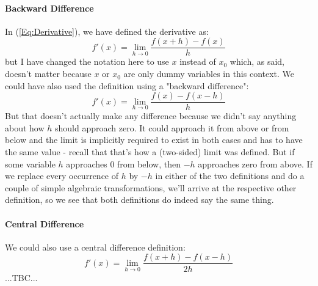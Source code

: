 \paragraph{Backward Difference}
In (\ref{Eq:Derivative}), we have defined the derivative as:
\begin{equation}
 f'(x) = \lim_{h \rightarrow 0} \frac{f(x + h) - f(x)}{h}
\end{equation}
but I have changed the notation here to use $x$ instead of $x_0$ which, as said, doesn't matter because $x$ or $x_0$ are only dummy variables in this context. We could have also used the definition using a "backward difference":
\begin{equation}
 f'(x) = \lim_{h \rightarrow 0} \frac{f(x) - f(x-h)}{h}
\end{equation}
But that doesn't actually make any difference because we didn't say anything about how $h$ should approach zero. It could approach it from above or from below and the limit is implicitly required to exist in both cases and has to have the same value - recall that that's how a (two-sided) limit was defined. But if some variable $h$ approaches $0$ from below, then $-h$ approaches zero from above. If we replace every occurrence of $h$ by $-h$ in either of the two definitions and do a couple of simple algebraic transformations, we'll arrive at the respective other definition, so we see that both definitions do indeed say the same thing.


\paragraph{Central Difference} 
We could also use a central difference definition:
\begin{equation}
 f'(x) = \lim_{h \rightarrow 0} \frac{f(x+h) - f(x-h)}{2 h}
\end{equation}
...TBC...


